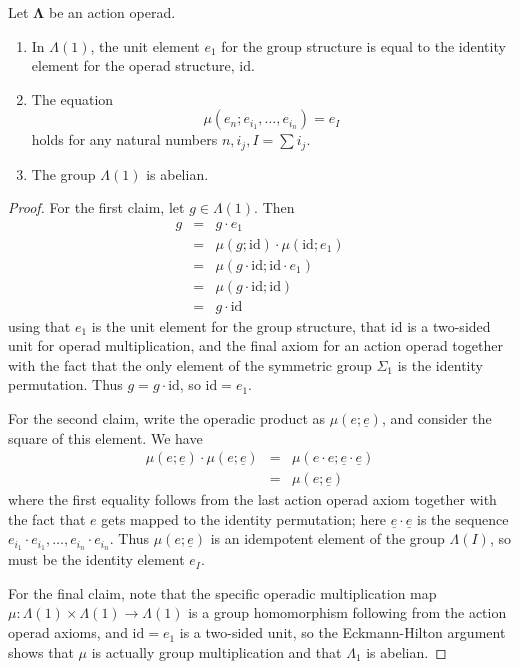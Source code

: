 \documentclass{amsbook} %
\newcommand{\ML}{\mathbf{\Lambda}}
\numberwithin{section}{chapter}
\begin{document}
\begin{lem}\label{calclem}
Let $\ML$ be an action operad.
\begin{enumerate}
\item In $\Lambda(1)$, the unit element $e_{1}$ for the group structure is equal to the identity element for the operad structure, $\textrm{id}$.
\item The equation
\[
\mu(e_{n}; e_{i_{1}}, \ldots, e_{i_{n}}) = e_{I}
\]
holds for any natural numbers $n, i_{j}, I = \sum i_{j}$.
\item The group $\Lambda(1)$ is abelian.
\end{enumerate}
\end{lem}
\begin{proof}
For the first claim, let $g \in \Lambda(1)$.  Then
\[
\begin{array}{rcl}
g & = & g \cdot e_{1} \\
& = & \mu(g; \textrm{id}) \cdot \mu(\textrm{id}; e_{1}) \\
& = & \mu(g \cdot \textrm{id}; \textrm{id} \cdot e_{1}) \\
& = & \mu(g \cdot \textrm{id}; \textrm{id}) \\
& = & g \cdot \textrm{id}
\end{array}
\]
using that $e_{1}$ is the unit element for the group structure, that $\textrm{id}$ is a two-sided unit for operad multiplication, and the final axiom for an action operad together with the fact that the only element of the symmetric group $\Sigma_{1}$ is the identity permutation.  Thus $g = g \cdot \textrm{id}$, so $\textrm{id} = e_{1}$.

For the second claim, write the operadic product as $\mu(e; \underline{e})$, and consider the square of this element. We have
\[
\begin{array}{rcl}
\mu(e; \underline{e}) \cdot \mu(e; \underline{e}) & = & \mu(e \cdot e; \underline{e} \cdot \underline{e}) \\
&= & \mu(e; \underline{e})
\end{array}
\]
where the first equality follows from the last action operad axiom together with the fact that $e$ gets mapped to the identity permutation; here $\underline{e} \cdot \underline{e}$ is the sequence $e_{i_{1}} \cdot e_{i_{1}}, \ldots, e_{i_{n}} \cdot e_{i_{n}}$.  Thus $\mu(e; \underline{e})$ is an idempotent element of the group $\Lambda(I)$, so must be the identity element $e_{I}$.

For the final claim, note that the specific operadic multiplication map $\mu \colon \Lambda(1) \times \Lambda(1) \rightarrow \Lambda(1)$ is a group homomorphism following from the action operad axioms, and $\textrm{id} = e_{1}$ is a two-sided unit, so the Eckmann-Hilton argument shows that $\mu$ is actually group multiplication and that $\Lambda_{1}$ is abelian.
\end{proof}
\end{document}
